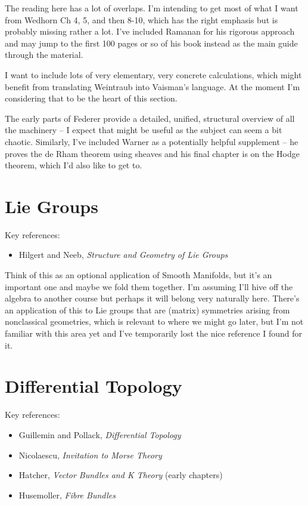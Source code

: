 \documentclass[article]{article}
\begin{document}
The reading here has a lot of overlaps. I'm intending to get most of what I want from Wedhorn Ch 4, 5, and then 8-10, which has the right emphasis but is probably missing rather a lot. I've included Ramanan for his rigorous approach and may jump to the first 100 pages or so of his book instead as the main guide through the material.

I want to include lots of very elementary, very concrete calculations, which might benefit from translating Weintraub into Vaisman's language. At the moment I'm considering that to be the heart of this section.

The early parts of Federer provide a detailed, unified, structural overview of all the machinery -- I expect that might be useful as the subject can seem a bit chaotic. Similarly, I've included Warner as a potentially helpful supplement -- he proves the de Rham theorem using sheaves and his final chapter is on the Hodge theorem, which I'd also like to get to.

\section{Lie Groups}
Key references:
\begin{itemize}
	\item{Hilgert and Neeb, \textit{Structure and Geometry of Lie Groups}}
\end{itemize}

Think of this as an optional application of Smooth Manifolds, but it's an important one and maybe we fold them together. I'm assuming I'll hive off the algebra to another course but perhaps it will belong very naturally here. There's an application of this to Lie groups that are (matrix) symmetries arising from nonclassical geometries, which is relevant to where we might go later, but I'm not familiar with this area yet and I've temporarily lost the nice reference I found for it.

\section{Differential Topology}

Key references:
\begin{itemize}
	\item{Guillemin and Pollack, \textit{Differential Topology}}
	\item{Nicolaescu, \textit{Invitation to Morse Theory}}
	\item{Hatcher, \textit{Vector Bundles and K Theory} (early chapters)}
	\item{Husemoller, \textit{Fibre Bundles}}
\end{itemize}
\end{document}
